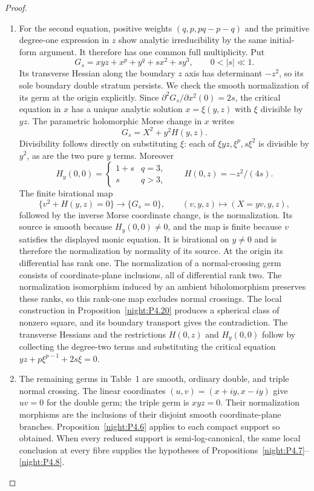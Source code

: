 \begin{proof}
\begin{enumerate}[label={$\langle1\rangle$\arabic*.},leftmargin=*]
\item For the second equation, positive weights
$(q,p,pq-p-q)$ and the primitive degree-one expression in $z$
show analytic irreducibility by the same initial-form argument.
It therefore has one common full multiplicity. Put
\[
 G_s=xyz+x^p+y^q+s x^2+s y^3,
 \qquad 0<|s|\ll1.
\]
Its transverse Hessian along the boundary
$z$ axis has determinant $-z^2$,
so its sole boundary double stratum
persists. We check the smooth normalization
of its germ at the origin explicitly.
Since $\partial^2G_s/\partial x^2(0)=2s$,
the critical equation in $x$ has a unique
analytic solution $x=\xi(y,z)$ with
$\xi$ divisible by $yz$. The parametric
holomorphic Morse change in $x$ writes
\[
 G_s=X^2+y^2H(y,z).
\]
Divisibility follows directly on substituting
$\xi$: each of $\xi yz,\xi^p,s\xi^2$
is divisible by $y^2$, as are the two
pure $y$ terms. Moreover
\[
 H_y(0,0)=
 \begin{cases}1+s&q=3,\\s&q>3,\end{cases}
 \qquad H(0,z)=-z^2/(4s).
\]
The finite
birational map
\[
 \{v^2+H(y,z)=0\}\longrightarrow\{G_s=0\},
 \qquad (v,y,z)\longmapsto(X=yv,y,z),
\]
followed by the inverse Morse coordinate
change, is the normalization. Its source
is smooth because $H_y(0,0)\ne0$,
and the map is finite because $v$
satisfies the displayed monic equation.
It is birational on $y\ne0$ and is
therefore the normalization by normality
of its source. At the origin its
differential has rank one. The normalization of a normal-crossing
germ consists of coordinate-plane inclusions, all of differential rank
two. The normalization isomorphism induced by an ambient biholomorphism
preserves these ranks, so this rank-one map excludes normal crossings. The local construction in Proposition~\ref{night:P4.20} produces
a spherical class of nonzero square, and its boundary transport gives
the contradiction. The transverse Hessians and the restrictions
$H(0,z)$ and $H_y(0,0)$ follow by collecting the degree-two terms
and substituting the critical equation
$yz+p\xi^{p-1}+2s\xi=0$.

\item The remaining germs in Table~1 are smooth, ordinary double,
and triple normal crossing. The linear coordinates
$(u,v)=(x+iy,x-iy)$ give $uv=0$ for the double germ;
the triple germ is $xyz=0$. Their normalization morphisms are the
inclusions of their disjoint smooth coordinate-plane branches.
Proposition~\ref{night:P4.6} applies to each compact support so obtained.
When every reduced support is semi-log-canonical, the same local
conclusion at every fibre supplies the hypotheses of
Propositions~\ref{night:P4.7}--\ref{night:P4.8}.

\end{enumerate}
\end{proof}
